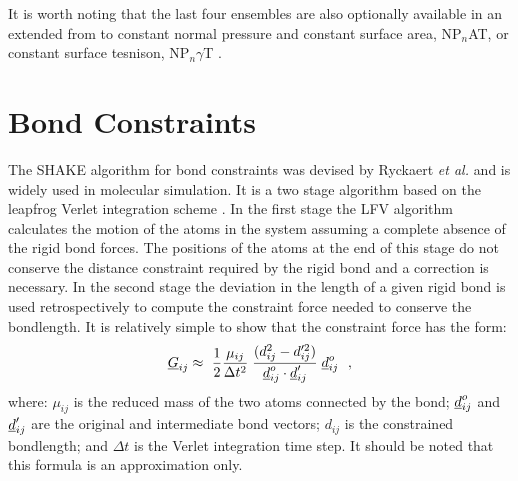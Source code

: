 It is worth noting that the last four ensembles are also optionally
available in an extended from to constant normal pressure and
constant surface area, NP$_{n}$AT, or constant surface tesnison,
NP$_{n}\gamma$T \cite{ikeguchi-04}.

\section{Bond Constraints}
\label{shake-rattle}

The SHAKE algorithm  for bond constraints
was devised by Ryckaert {\em et al.} \cite{ryckaert-77a} and is
widely used in molecular simulation.  It is a two stage algorithm
based on the leapfrog Verlet integration
scheme \cite{allen-89a}.  In the first stage the LFV algorithm
calculates the motion of the atoms in the system assuming a
complete absence of the rigid bond
forces. The positions of the atoms at the end of this stage
do not conserve the distance constraint required by the
rigid bond and a correction is necessary.
In the second stage the deviation in the length of a given
rigid bond is used retrospectively to
compute the constraint force needed to conserve the bondlength.
It is relatively simple to show that the constraint force has the form:
\begin{equation}
\mbox{$\underline{G}$}_{ij} \approx\ {1 \over 2} {\mu_{ij} \over \Delta t^{2}} \;
{(d_{ij}^{2} - d_{ij}'^{2}) \over \mbox{$\underline{d}$}_{ij}^{o} \cdot
\mbox{$\underline{d}$}_{ij}'} \; \mbox{$\underline{d}$}_{ij}^{o}~~, \label{g12}
\end{equation}
where: $\mu_{ij}$ is the reduced mass of the two atoms connected
by the bond; $\mbox{$\underline{d}$}_{ij}^{o}$ and $\mbox{$\underline{d}$}_{ij}'$ are the
original and intermediate bond vectors; $d_{ij}$ is the
constrained bondlength; and $\Delta t$ is the
Verlet integration time step.  It should
be noted that this formula is an approximation only.

